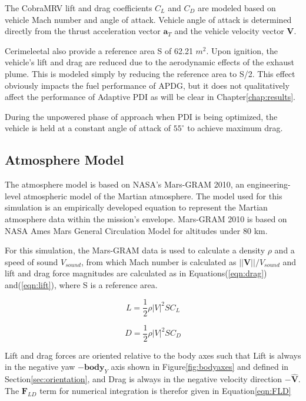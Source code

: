 The CobraMRV lift and drag coefficients $C_L$ and $C_D$ are modeled based on vehicle Mach number and angle of attack. Vehicle angle of attack is determined directly from the thrust acceleration vector $\bm{a}_T$ and the vehicle velocity vector $\bm{V}$.

Cerimele\:et\:al also provide a reference area S of 62.21 $m^2$. Upon ignition, the vehicle's lift and drag are reduced due to the aerodynamic effects of the exhaust plume. This is modeled simply by reducing the reference area to S/2. This effect obviously impacts the fuel performance of APDG, but it does not qualitatively affect the performance of Adaptive PDI as will be clear in Chapter\:\ref{chap:results}.

During the unpowered phase of approach when PDI is being optimized, the vehicle is held at a constant angle of attack of $55^{\circ}$ to achieve maximum drag. 

\pagebreak
\subsection{Atmosphere Model}\label{sec:atmosphere}
The atmosphere model is based on NASA's Mars-GRAM 2010\:\cite{MARSGRAM}, an engineering-level atmospheric model of the Martian atmosphere. The model used for this simulation is an empirically developed equation to represent the Martian atmosphere data within the mission's envelope. Mars-GRAM 2010 is based on NASA Ames Mars General Circulation Model for altitudes under 80 km.

For this simulation, the Mars-GRAM data is used to calculate a density $\rho$ and a speed of sound $V_{sound}$, from which Mach number is calculated as $||\bm{V}||/V_{sound}$ and lift and drag force magnitudes are calculated as in Equations\:(\ref{eqn:drag}) and\:(\ref{eqn:lift}), where S is a reference area.


\begin{equation}
\label{eqn:lift}
L = \frac{1}{2} \rho |V|^2 S C_L
\end{equation}

\begin{equation}
\label{eqn:drag}
D = \frac{1}{2} \rho |V|^2 S C_D
\end{equation}

Lift and drag forces are oriented relative to the body axes such that Lift is always in the negative yaw $-\bm{body}_Y$ axis shown in Figure\:\ref{fig:bodyaxes} and defined in Section\:\ref{sec:orientation}, and Drag is always in the negative velocity direction $-\bm{\hat{V}}$. The $\bm{F}_{LD}$ term for numerical integration is therefor given in Equation\:\ref{eqn:FLD}

